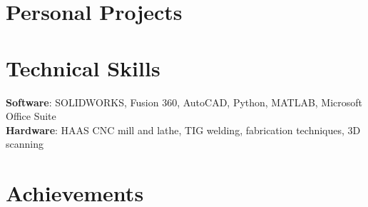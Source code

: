 \documentclass[letterpaper,11pt]{article}
\begin{document}
\section{Personal Projects}

\section{Technical Skills}
 \begin{itemize}[leftmargin=0.15in, label={}]
    \small{\item{
     \textbf{Software}{: SOLIDWORKS, Fusion 360, AutoCAD, Python, MATLAB, Microsoft Office Suite} \\
     \textbf{Hardware}{: HAAS CNC mill and lathe, TIG welding, fabrication techniques, 3D scanning} \\
    }}
 \end{itemize}
 \vspace{-16pt}

\section{Achievements}
\end{document}
